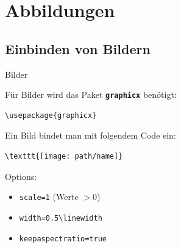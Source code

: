 \section{Abbildungen}
\subsection{Einbinden von Bildern}
\begin{frame}[fragile]{Bilder}
\begin{minipage}{0.6\linewidth}
Für Bilder wird das Paket \textbf{\texttt{graphicx}} benötigt:
\begin{lstlisting}[style=tex]
\usepackage{graphicx}
\end{lstlisting}

Ein Bild bindet man mit folgendem Code ein:

\begin{lstlisting}[style=tex]
\texttt{[image: path/name]}
\end{lstlisting}

Options:
\begin{itemize}
\item \verb|scale=1| (Werte $>0$)
\item \verb|width=0.5\linewidth|
\item \verb|keepaspectratio=true|
\end{itemize}


\end{minipage}
\end{frame}
